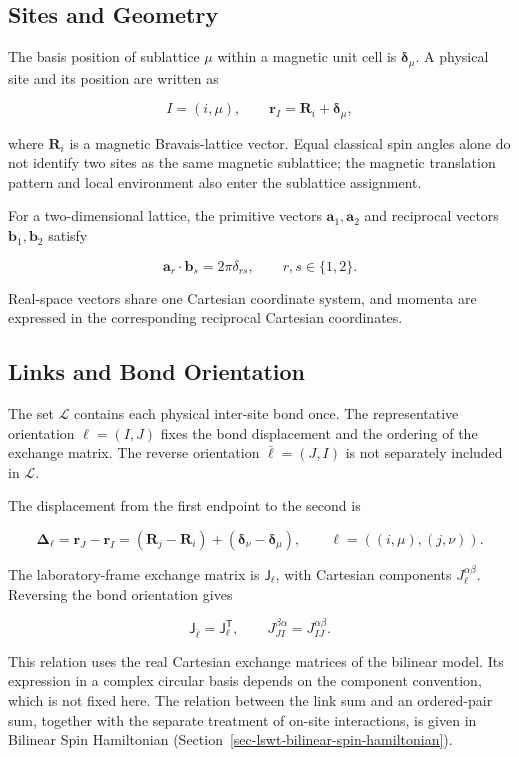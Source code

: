 \subsection{Sites and Geometry}

The basis position of sublattice \(\mu\) within a magnetic unit cell is \(\boldsymbol\delta_\mu\). A physical site and its position are written as

\[
I=(i,\mu),
\qquad
\mathbf r_I=\mathbf R_i+\boldsymbol\delta_\mu,
\]

where \(\mathbf R_i\) is a magnetic Bravais-lattice vector. Equal classical spin angles alone do not identify two sites as the same magnetic sublattice; the magnetic translation pattern and local environment also enter the sublattice assignment.

For a two-dimensional lattice, the primitive vectors \(\mathbf a_1,\mathbf a_2\) and reciprocal vectors \(\mathbf b_1,\mathbf b_2\) satisfy

\[
\mathbf a_r\cdot\mathbf b_s=2\pi\delta_{rs},
\qquad r,s\in\{1,2\}.
\]

Real-space vectors share one Cartesian coordinate system, and momenta are expressed in the corresponding reciprocal Cartesian coordinates.

\subsection{Links and Bond Orientation}

The set \(\mathcal L\) contains each physical inter-site bond once. The representative orientation \(\ell=(I,J)\) fixes the bond displacement and the ordering of the exchange matrix. The reverse orientation \(\bar\ell=(J,I)\) is not separately included in \(\mathcal L\).

The displacement from the first endpoint to the second is

\[
\boldsymbol\Delta_\ell
=\mathbf r_J-\mathbf r_I
=(\mathbf R_j-\mathbf R_i)
 +(\boldsymbol\delta_\nu-\boldsymbol\delta_\mu),
\qquad
\ell=((i,\mu),(j,\nu)).
\]

The laboratory-frame exchange matrix is \(\mathsf J_\ell\), with Cartesian components \(J_\ell^{\alpha\beta}\). Reversing the bond orientation gives

\[
\mathsf J_{\bar\ell}=\mathsf J_\ell^{\mathsf T},
\qquad
J_{JI}^{\beta\alpha}=J_{IJ}^{\alpha\beta}.
\]

This relation uses the real Cartesian exchange matrices of the bilinear model. Its expression in a complex circular basis depends on the component convention, which is not fixed here. The relation between the link sum and an ordered-pair sum, together with the separate treatment of on-site interactions, is given in Bilinear Spin Hamiltonian (Section~\ref{sec-lswt-bilinear-spin-hamiltonian}).

